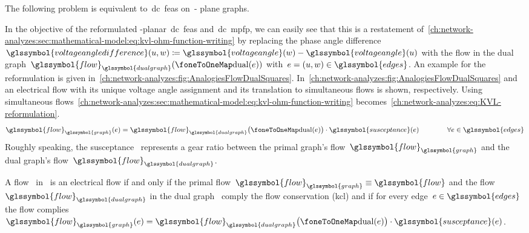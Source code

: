 The following problem is equivalent to~\gls{dc}~\gls{feas} on~\source-\sink
plane graphs.
%
\begingroup
    
    \label{ch:networkAnalysis:problems:DC_FEAS_simultaneous_flow-Decision_Problem}
\endgroup
% 
In the objective of the reformulated \source-\sink planar~\gls{dc}~\gls{feas}
and~\gls{dc}~\gls{mpfp}, we can easily see that this is a restatement
of~\cref{ch:network-analyzes:sec:mathematical-model:eq:kvl-ohm-function-writing}
by replacing the phase angle difference~$\glssymbol{voltageangledifference}
(\vertexa,\vertexc)\coloneqq\glssymbol{voltageangle}(\vertexc)-
\glssymbol{voltageangle}(\vertexa)$ with the flow in the dual
graph~$\glssymbol{flow}_{\glssymbol{dualgraph}}(\oneToOneMap(\edge))$ with~$\edge =
(\vertexa,\vertexc)\in\glssymbol{edges}$. An example for the reformulation is
given in~\cref{ch:network-analyzes:fig:AnalogiesFlowDualSquares}.
In~\cref{ch:network-analyzes:fig:AnalogiesFlowDualSquares}
and~ an electrical flow with its unique voltage angle assignment and
its translation to simultaneous flows is shown, respectively. Using simultaneous
flows~\cref{ch:network-analyzes:sec:mathematical-model:eq:kvl-ohm-function-writing}
becomes~\cref{ch:network-analyzes:eq:KVL-reformulation}.
% 
\begin{equation}
    \glssymbol{flow}_{\glssymbol{graph}}(\edge) 
    =
    \glssymbol{flow}_{\glssymbol{dualgraph}} 
    \big(\oneToOneMap(\edge)\big)
    \cdot
    \glssymbol{susceptance}(\edge)
    \qquad\qquad
    \forall \edge \in \glssymbol{edges}
    \label{ch:network-analyzes:eq:KVL-reformulation}
\end{equation}
% 
Roughly speaking, the susceptance~ represents a gear
ratio between the primal graph's flow~$\glssymbol{flow}_{\glssymbol{graph}}$ and
the dual graph's flow~$\glssymbol{flow}_{\glssymbol{dualgraph}}$. 
% 
\begin{theorem}
    A flow~ in~ is an electrical flow if and
    only if the primal flow~$\glssymbol{flow}_{
    \glssymbol{graph}}\equiv\glssymbol{flow}$ and the
    flow~$\glssymbol{flow}_{\glssymbol{dualgraph}}$ in the dual
    graph~ comply the flow conservation (\gls{kcl}) and if
    for every edge~$\edge\in\glssymbol{edges}$ the flow
    complies~$\glssymbol{flow}_{\glssymbol{graph}}(\edge) =
    \glssymbol{flow}_{\glssymbol{dualgraph}}\big(\oneToOneMap
    (\edge)\big)\cdot\glssymbol{susceptance}(\edge)$.
    \label{ch:network-analyzes:thm:electrical-flow-based-definition}
\end{theorem}
